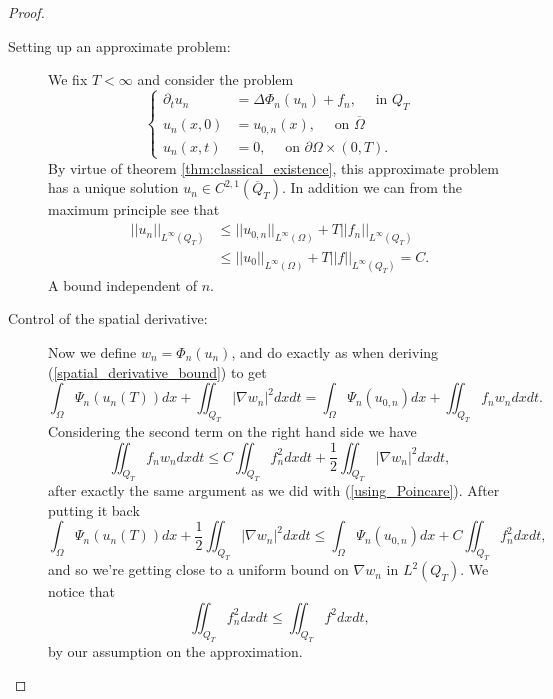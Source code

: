 \documentclass[11pt, a4paper]{article}
\begin{document}
\begin{proof}

\begin{description}
	\item[Setting up an approximate problem:] We fix $T<\infty$ and consider the problem
		\begin{equation}
		\label{approximate_problem}
			\begin{cases}
			\partial_t u_n &= \Delta\Phi_n(u_n) + f_n, \quad \text{ in } Q_T \\
			u_n(x,0) &= u_{0,n}(x),	\quad \text{ on } \overline{\Omega} \\
			u_n(x,t) &= 0, \quad \text{ on }  \partial \Omega \times (0,T).
			\end{cases}
		\end{equation}			
	By virtue of theorem \ref{thm:classical_existence}, this approximate problem has a unique solution $u_n \in C^{2,1}(\overline{Q}_T)$. In addition we can from the maximum principle see that
	\begin{align*}
	||u_n||_{L^\infty(Q_T)} &\leq ||u_{0,n}||_{L^\infty(\Omega)} + T||f_n||_{L^\infty(Q_T)} \\
	&\leq ||u_0||_{L^\infty(\Omega)} + T||f||_{L^\infty(Q_T)} = C.
	\end{align*}
	A bound independent of $n$.
	
	\item[Control of the spatial derivative:] Now we define $w_n = \Phi_n(u_n)$, and do exactly as when deriving (\ref{spatial_derivative_bound}) to get 
	\begin{equation*}
	\int_\Omega \Psi_n(u_n(T))dx + \iint_{Q_T}|\nabla w_n|^2dxdt = \int_\Omega \Psi_n(u_{0,n})dx + \iint_{Q_T}f_n w_n dxdt.
	\end{equation*}
	Considering the second term on the right hand side we have
	\begin{equation*}
	\iint_{Q_T}f_n w_n dxdt \leq C\iint_{Q_T}f_n^2 dxdt + \frac{1}{2}\iint_{Q_T}|\nabla w_n|^2dxdt,
	\end{equation*}
	after exactly the same argument as we did with (\ref{using_Poincare}). After putting it back
	\begin{equation}
	\label{exist_proof_spatial}
	\int_\Omega \Psi_n(u_n(T))dx + \frac{1}{2}\iint_{Q_T}|\nabla w_n|^2 dxdt \leq \int_\Omega \Psi_n(u_{0,n})dx + C\iint_{Q_T}f_n^2 dxdt,
	\end{equation}
	and so we're getting close to a uniform bound on $\nabla w_n$ in $L^2(Q_T)$. We notice that
	\begin{equation*}
	\iint_{Q_T}f_n^2dxdt \leq \iint_{Q_T} f^2 dxdt,
	\end{equation*}
	by our assumption on the approximation.
	

\end{description}
\end{proof}
\end{document}
